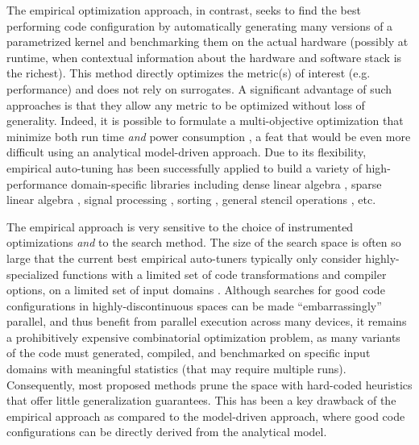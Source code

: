 \documentclass{sig-alternate}
\begin{document}

The empirical optimization approach, in contrast, seeks to find the best
performing code configuration by automatically generating many versions of a
parametrized kernel and benchmarking them on the actual hardware (possibly at
runtime, when contextual information about the hardware and software stack is
the richest). This method directly optimizes the metric(s) of interest (e.g. performance) and does not rely on
surrogates.  A significant advantage of such approaches is that they allow any metric to be
optimized without loss of generality. Indeed, it is possible to formulate a multi-objective optimization that minimize both run time \emph{and}
power consumption \citep{rahman2011automated}, a feat that would be even more difficult using an
analytical model-driven approach. Due to its flexibility,
empirical auto-tuning has been successfully applied to build a variety of high-performance
domain-specific libraries including dense linear algebra
\citep{clint2001automated, bilmes1997optimizing}, sparse linear algebra
\citep{vuduc2005oski}, signal processing \citep{frigo2005design}, sorting
\citep{li2004dynamically}, general stencil operations \citep{kamil2010auto}, etc.


The empirical approach is very sensitive to the choice of instrumented
optimizations \emph{and} to the search method. The size of the search space is
often so large that the current best empirical auto-tuners typically only consider
highly-specialized functions with a limited set of code transformations and
compiler options, on a limited set of input domains \citep{ganapathi2009case}. Although
searches for good code configurations in highly-discontinuous spaces can
be made ``embarrassingly'' parallel, and thus benefit from parallel execution across many devices, it remains a prohibitively
expensive combinatorial optimization problem, as many variants of the code must
generated, compiled, and benchmarked on specific input domains with meaningful
statistics (that may require multiple runs). Consequently, most proposed
methods prune the space with hard-coded heuristics that offer little
generalization guarantees. This has been a key drawback of the empirical
approach as compared to the model-driven approach, where good code configurations
can be directly derived from the analytical model.

\end{document}
